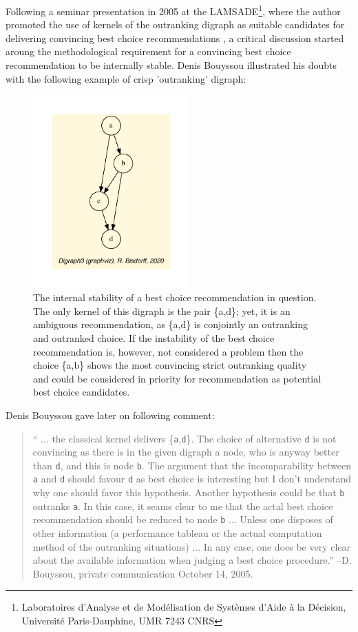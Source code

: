 Following a seminar presentation in 2005 at the LAMSADE\footnote{Laboratoires d'Analyse et de Modélisation de Systèmes d'Aide à la Décision, Université Paris-Dauphine, UMR 7243 CNRS}, where the author promoted the use of kernels of the outranking digraph as suitable candidates for delivering convincing best choice recommendations \citep{BIS-2005}, a critical discussion started aroung the methodological requirement for a convincing best choice recommendation to be internally stable. Denis Bouyssou illustrated his doubts with the following example of crisp 'outranking' digraph:
\begin{figure}[h]
\sidecaption[t]
\includegraphics[width=6cm]{Figures/bouyssou11Oct05crisp.pdf}
\caption{The internal stability of a best choice recommendation in question. The only kernel of this digraph is the pair \{a,d\}; yet, it is an ambiguous recommendation, as \{a,d\} is conjointly an outranking and outranked choice. If the instability of the best choice recommendation is, however, not considered a problem then the choice \{a,b\} shows the most convincing strict outranking quality and could be considered in priority for recommendation as potential best choice candidates.}
\label{fig:4.6}       %
\end{figure}
Denis Bouyssou gave later on following comment:
\begin{quotation}
`` ... the classical kernel delivers \{\texttt{a},\texttt{d}\}. The choice of alternative \texttt{d} is not convincing as there is in the given digraph a node, who is anyway better than \texttt{d}, and this is node \texttt{b}. The argument that the incomparability between \texttt{a} and \texttt{d} should favour \texttt{d} as best choice is interesting but I don't understand why one should favor this hypothesis. Another hypothesis could be that \texttt{b} outranks \texttt{a}. In this case, it seams clear to me that the actal best choice recommendation should be reduced to node \texttt{b} ... Unless one disposes of other information (a performance tableau or the actual computation method of the outranking situations) ... In any case, one does be very clear about the available information when judging a best choice procedure.'' --D. Bouyssou, private communication October 14, 2005.
\end{quotation}
